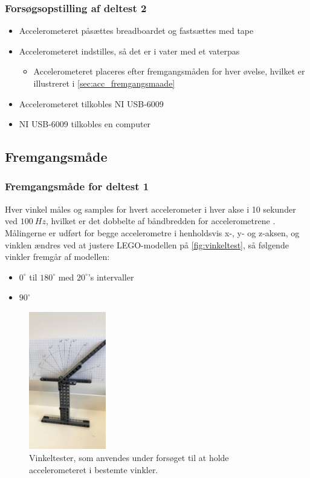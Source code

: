 \subsubsection{Forsøgsopstilling af deltest 2}
\begin{itemize}
\item Accelerometeret påsættes breadboardet og fastsættes med tape
\item Accelerometeret indstilles, så det er i vater med et vaterpas
\begin{itemize}
\item Accelerometeret placeres efter fremgangsmåden for hver øvelse, hvilket er illustreret i \autoref{sec:acc_fremgangsmaade}
\end{itemize}
\item Accelerometeret tilkobles NI USB-6009
\item NI USB-6009 tilkobles en computer
\end{itemize}

\subsection{Fremgangsmåde}  

\subsubsection{Fremgangsmåde for deltest 1} \label{sec:vinkel_fremgangsmaade}
Hver vinkel måles og samples for hvert accelerometer i hver akse i 10 sekunder ved $100~Hz$, hvilket er det dobbelte af båndbredden for accelerometrene \citep{analogdevices2010}. Målingerne er udført for begge accelerometre i henholdsvis x-, y- og z-aksen, og vinklen ændres ved at justere LEGO-modellen på \autoref{fig:vinkeltest}, så følgende vinkler fremgår af modellen:
\begin{itemize}
\item $0^{\circ}$ til $180^{\circ}$ med $20^{\circ}$'s intervaller
\item $90^{\circ}$  
\end{itemize}


\begin{figure}[H]
\centering
\includegraphics[width=0.3\textwidth]{figures/vinkeltest}
\caption{Vinkeltester, som anvendes under forsøget til at holde accelerometeret i bestemte vinkler.}
\label{fig:vinkeltest}
\end{figure}

